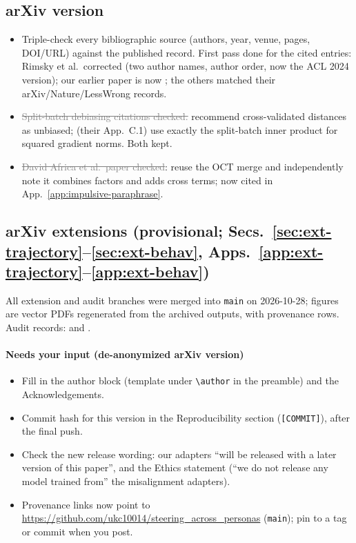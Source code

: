 \documentclass{article}
\newcommand{\done}[1]{\textcolor{gray}{\sout{#1}}}
\begin{document}
\subsection*{arXiv version}
\begin{itemize}
  \item Triple-check every bibliographic source (authors, year, venue, pages, DOI/URL) against the published record. First pass done for the cited entries: Rimsky et al.\ corrected (two author names, author order, now the ACL 2024 version); our earlier paper is now \citet{davies2026personas}; the others matched their arXiv/Nature/LessWrong records.
  \item \done{Split-batch debiasing citations checked.} \citet{WaltherEtAl2016} recommend cross-validated distances as unbiased; \citet{WuEtAl2026} (their App.~C.1) use exactly the split-batch inner product for squared gradient norms. Both kept.
  \item \done{David Africa et al.\ paper checked}: \citet{baines2026personacartography} reuse the OCT merge and independently note it combines factors and adds cross terms; now cited in App.~\ref{app:impulsive-paraphrase}.
\end{itemize}

\subsection*{arXiv extensions (provisional; Secs.~\ref{sec:ext-trajectory}--\ref{sec:ext-behav}, Apps.~\ref{app:ext-trajectory}--\ref{app:ext-behav})}
All extension and audit branches were merged into \texttt{main} on 2026-10-28; figures are vector PDFs regenerated from the archived outputs, with provenance rows. Audit records:  and .

\paragraph{Needs your input (de-anonymized arXiv version)}
\begin{itemize}
  \item Fill in the author block (template under \texttt{\textbackslash author} in the preamble) and the Acknowledgements.
  \item Commit hash for this version in the Reproducibility section (\texttt{[COMMIT]}), after the final push.
  \item Check the new release wording: our adapters ``will be released with a later version of this paper'', and the Ethics statement (``we do not release any model trained from'' the misalignment adapters).
  \item Provenance links now point to \url{https://github.com/ukc10014/steering_across_personas} (\texttt{main}); pin to a tag or commit when you post.
\end{itemize}
\end{document}
